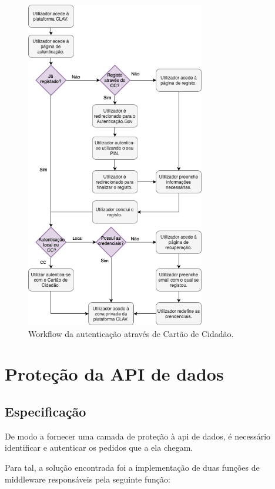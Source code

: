 \begin{figure}[h!]
    \centering
    \includegraphics[width=0.695\textwidth]{img/diagramas/authCC/AuthCC.png}
    \caption{Workflow da autenticação através de Cartão de Cidadão.}
    \label{fig:flow_authCC}
\end{figure}

\cleardoublepage
\section{Proteção da API de dados} \label{protecaoAPI}

\subsection{Especificação}

De modo a fornecer uma camada de proteção à \gls{api} de dados, é necessário identificar e autenticar os pedidos que a ela chegam.

Para tal, a solução encontrada foi a implementação de duas funções de middleware responsáveis pela seguinte função:

